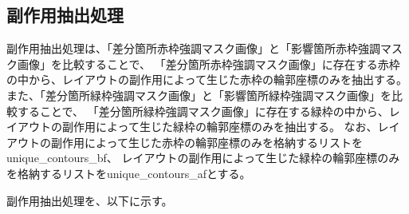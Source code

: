 \subsection{副作用抽出処理}\label{subsec:Layout_subeffect_extraction}
副作用抽出処理は、「差分箇所赤枠強調マスク画像」と「影響箇所赤枠強調マスク画像」を比較することで、
「差分箇所赤枠強調マスク画像」に存在する赤枠の中から、レイアウトの副作用によって生じた赤枠の輪郭座標のみを抽出する。
また、「差分箇所緑枠強調マスク画像」と「影響箇所緑枠強調マスク画像」を比較することで、
「差分箇所緑枠強調マスク画像」に存在する緑枠の中から、レイアウトの副作用によって生じた緑枠の輪郭座標のみを抽出する。
なお、レイアウトの副作用によって生じた赤枠の輪郭座標のみを格納するリストをunique\_contours\_bf、
レイアウトの副作用によって生じた緑枠の輪郭座標のみを格納するリストをunique\_contours\_afとする。
\par
副作用抽出処理を、以下に示す。
